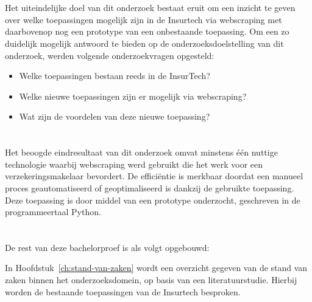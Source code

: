 \section{}
\label{sec:onderzoeksvraag}

Het uiteindelijke doel van dit onderzoek bestaat eruit om een inzicht te geven over welke toepassingen mogelijk zijn in de Insurtech via webscraping met daarbovenop nog een prototype van een onbestaande toepassing. Om een zo duidelijk mogelijk antwoord te bieden op de onderzoeksdoelstelling van dit onderzoek, werden volgende onderzoekvragen opgesteld:
\begin{itemize}
	\item Welke toepassingen bestaan reeds in de InsurTech?
	\item Welke nieuwe toepassingen zijn er mogelijk via webscraping?
	\item Wat zijn de voordelen van deze nieuwe toepassing?
\end{itemize}

\section{}
\label{sec:onderzoeksdoelstelling}

Het beoogde eindresultaat van dit onderzoek omvat minstens één nuttige technologie waarbij webscraping werd gebruikt die het werk voor een verzekeringsmakelaar bevordert. De efficiëntie is merkbaar doordat een manueel proces geautomatiseerd of geoptimaliseerd is dankzij de gebruikte toepassing. Deze toepassing is door middel van een prototype onderzocht, geschreven in de programmeertaal Python.

\section{}
\label{sec:opzet-bachelorproef}


De rest van deze bachelorproef is als volgt opgebouwd:

In Hoofdstuk~\ref{ch:stand-van-zaken} wordt een overzicht gegeven van de stand van zaken binnen het onderzoeksdomein, op basis van een literatuurstudie. Hierbij worden de bestaande toepassingen van de Insurtech besproken.

